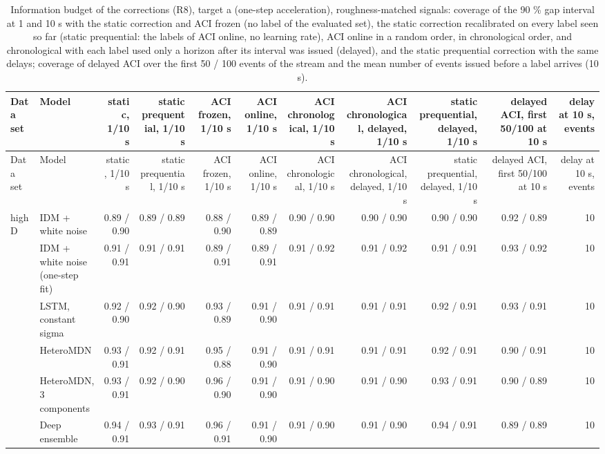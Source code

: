 \begin{longtable}{llrrrrrrrrr}
\caption{Information budget of the corrections (R8), target a (one-step acceleration), roughness-matched signals: coverage of the 90 \% gap interval at 1 and 10 s with the static correction and ACI frozen (no label of the evaluated set), the static correction recalibrated on every label seen so far (static prequential: the labels of ACI online, no learning rate), ACI online in a random order, in chronological order, and chronological with each label used only a horizon after its interval was issued (delayed), and the static prequential correction with the same delays; coverage of delayed ACI over the first 50 / 100 events of the stream and the mean number of events issued before a label arrives (10 s).}\label{tab:t4-info-budget--matched--a} \\
\toprule
Data set & Model & static, 1/10 s & static prequential, 1/10 s & ACI frozen, 1/10 s & ACI online, 1/10 s & ACI chronological, 1/10 s & ACI chronological, delayed, 1/10 s & static prequential, delayed, 1/10 s & delayed ACI, first 50/100 at 10 s & delay at 10 s, events \\
\midrule
\endfirsthead
\toprule
Data set & Model & static, 1/10 s & static prequential, 1/10 s & ACI frozen, 1/10 s & ACI online, 1/10 s & ACI chronological, 1/10 s & ACI chronological, delayed, 1/10 s & static prequential, delayed, 1/10 s & delayed ACI, first 50/100 at 10 s & delay at 10 s, events \\
\midrule
\endhead
\bottomrule
\endlastfoot
highD & IDM + white noise & 0.89 / 0.90 & 0.89 / 0.89 & 0.88 / 0.90 & 0.89 / 0.89 & 0.90 / 0.90 & 0.90 / 0.90 & 0.90 / 0.90 & 0.92 / 0.89 & 10 \\
 & IDM + white noise (one-step fit) & 0.91 / 0.91 & 0.91 / 0.91 & 0.89 / 0.91 & 0.89 / 0.91 & 0.91 / 0.92 & 0.91 / 0.92 & 0.91 / 0.91 & 0.93 / 0.92 & 10 \\
 & LSTM, constant sigma & 0.92 / 0.90 & 0.92 / 0.90 & 0.93 / 0.89 & 0.91 / 0.90 & 0.91 / 0.91 & 0.91 / 0.91 & 0.92 / 0.91 & 0.93 / 0.91 & 10 \\
 & HeteroMDN & 0.93 / 0.91 & 0.92 / 0.91 & 0.95 / 0.88 & 0.91 / 0.90 & 0.91 / 0.91 & 0.91 / 0.91 & 0.92 / 0.91 & 0.90 / 0.91 & 10 \\
 & HeteroMDN, 3 components & 0.93 / 0.91 & 0.92 / 0.90 & 0.96 / 0.90 & 0.91 / 0.90 & 0.91 / 0.90 & 0.91 / 0.90 & 0.93 / 0.91 & 0.90 / 0.89 & 10 \\
 & Deep ensemble & 0.94 / 0.91 & 0.93 / 0.91 & 0.96 / 0.91 & 0.91 / 0.90 & 0.91 / 0.90 & 0.91 / 0.90 & 0.94 / 0.91 & 0.89 / 0.89 & 10 \\

\end{longtable}
